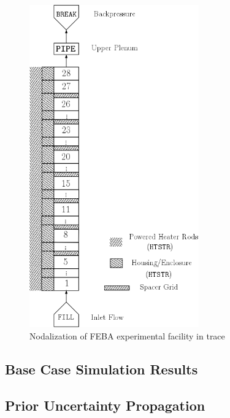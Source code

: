 \begin{figure}[bth]
    \centering
    \includegraphics[width=0.65\textwidth]{../figures/febaNodalization/febaNodalization.png}
    \caption[ nodalization of ]{Nodalization of FEBA experimental facility in \gls{trace}}
    \label{fig:feba_nodalization}
\end{figure}

\subsection{Base Case Simulation Results}

\subsection{Prior Uncertainty Propagation}

